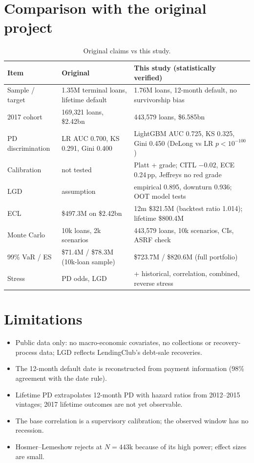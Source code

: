 \documentclass[11pt,a4paper]{article}
\newcommand{\1}{\mathbf{1}}
\begin{document}
\section{Comparison with the original project}
\begin{table}[H]\centering\small
\caption{Original claims vs this study.}
\begin{tabular}{p{3.6cm}p{4.6cm}p{6.6cm}}
\toprule
Item & Original & This study (statistically verified)\\
\midrule
Sample / target & 1.35M terminal loans, lifetime default & 1.76M loans, 12-month default, no survivorship bias\\
2017 cohort & 169{,}321 loans, \$2.42bn & 443{,}579 loans, \$6.585bn\\
PD discrimination & LR AUC 0.700, KS 0.291, Gini 0.400 & LightGBM AUC 0.725, KS 0.325, Gini 0.450 (DeLong vs LR $p<10^{-100}$)\\
Calibration & not tested & Platt + grade; CITL $-0.02$, ECE 0.24\,pp, Jeffreys no red grade\\
LGD & assumption & empirical 0.895, downturn 0.936; OOT model tests\\
ECL & \$497.3M on \$2.42bn & 12m \$321.5M (backtest ratio 1.014); lifetime \$800.4M\\
Monte Carlo & 10k loans, 2k scenarios & 443{,}579 loans, 10k scenarios, CIs, ASRF check\\
99\% VaR / ES & \$71.4M / \$78.3M (10k-loan sample) & \$723.7M / \$820.6M (full portfolio)\\
Stress & PD odds, LGD & + historical, correlation, combined, reverse stress\\
\bottomrule
\end{tabular}
\end{table}

\section{Limitations}
\begin{itemize}[itemsep=1pt]
\item Public data only: no macro-economic covariates, no collections or recovery-process data; LGD reflects LendingClub's debt-sale recoveries.
\item The 12-month default date is reconstructed from payment information (98\% agreement with the date rule).
\item Lifetime PD extrapolates 12-month PD with hazard ratios from 2012--2015 vintages; 2017 lifetime outcomes are not yet observable.
\item The base correlation is a supervisory calibration; the observed window has no recession.
\item Hosmer--Lemeshow rejects at $N=443$k because of its high power; effect sizes are small.
\end{itemize}
\end{document}
